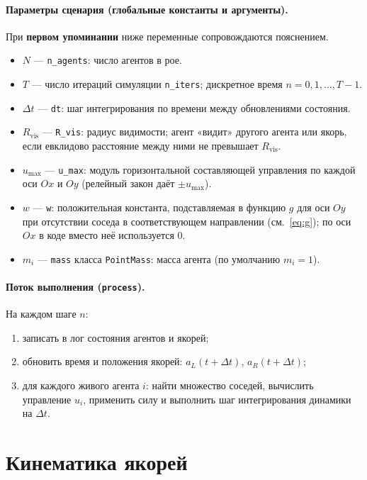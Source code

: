 \documentclass[12pt,a4paper]{article}
\begin{document}
\paragraph{Параметры сценария (глобальные константы и аргументы).}
При \textbf{первом упоминании} ниже переменные сопровождаются пояснением.

\begin{itemize}
  \item $N$ --- \texttt{n\_agents}: число агентов в рое.
  \item $T$ --- число итераций симуляции \texttt{n\_iters}; дискретное время $n = 0,1,\ldots,T-1$.
  \item $\Delta t$ --- \texttt{dt}: шаг интегрирования по времени между обновлениями состояния.
  \item $R_{\mathrm{vis}}$ --- \texttt{R\_vis}: радиус видимости; агент «видит» другого агента или якорь, если евклидово расстояние между ними не превышает $R_{\mathrm{vis}}$.
  \item $u_{\max}$ --- \texttt{u\_max}: модуль горизонтальной составляющей управления по каждой оси $Ox$ и $Oy$ (релейный закон даёт $\pm u_{\max}$).
  \item $w$ --- \texttt{w}: положительная константа, подставляемая в функцию $g$ для оси $Oy$ при отсутствии соседа в соответствующем направлении (см.\ \eqref{eq:g}); по оси $Ox$ в коде вместо неё используется $0$.
  \item $m_i$ --- \texttt{mass} класса \texttt{PointMass}: масса агента (по умолчанию $m_i = 1$).
\end{itemize}

\paragraph{Поток выполнения (\texttt{process}).}
На каждом шаге $n$:
\begin{enumerate}
  \item записать в лог состояния агентов и якорей;
  \item обновить время и положения якорей: $a_L(t+\Delta t)$, $a_R(t+\Delta t)$;
  \item для каждого живого агента $i$: найти множество соседей, вычислить управление $u_i$, применить силу и выполнить шаг интегрирования динамики на $\Delta t$.
\end{enumerate}

\section{Кинематика якорей}
\end{document}
